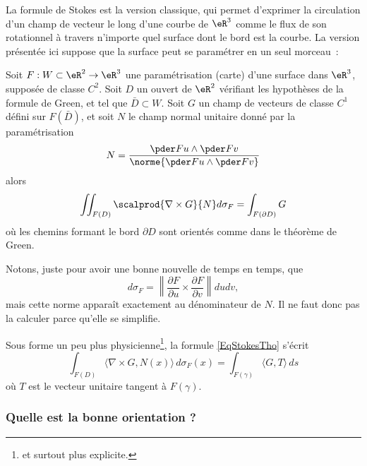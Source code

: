 La formule de Stokes est la version classique, qui permet d'exprimer la circulation d'un champ de vecteur le long d'une courbe de $\eR^3$ comme le flux de son rotationnel à travers n'importe quel surface dont le bord est la courbe. La version présentée ici suppose que la surface peut se paramétrer en un seul morceau~:
\begin{theorem}
  Soit $F : W\subset \eR^2 \to \eR^3$ une paramétrisation (carte) d'une surface dans $\eR^3$, supposée de classe $C^2$. Soit $D$ un ouvert de $\eR^2$ vérifiant les hypothèses de la formule de Green, et tel que $\bar D \subset W$. Soit $G$ un champ de vecteurs de classe $C^1$ défini sur $F(\bar D)$, et soit $N$ le champ normal unitaire donné par la paramétrisation
  \begin{equation}		
	N = \frac{\pder F u \wedge \pder F v}{\norme{\pder F u \wedge \pder F v}}
\end{equation}
  alors
  \begin{equation}\label{EqStokesTho}
    \iint_{F(D)} \scalprod{\nabla\times G}{N} d\sigma_F = \int_{F(\partial D)} G
  \end{equation}
  où les chemins formant le bord $\partial D$ sont orientés comme dans le théorème de Green.
\end{theorem}
Notons, juste pour avoir une bonne nouvelle de temps en temps, que 
\begin{equation}
	d\sigma_F=\left\| \frac{ \partial F }{ \partial u }\times\frac{ \partial F }{ \partial v }  \right\|dudv,
\end{equation}
mais cette norme apparaît exactement au dénominateur de $N$. Il ne faut donc pas la calculer parce qu'elle se simplifie.

Sous forme un peu plus physicienne\footnote{et surtout plus explicite.}, la formule \eqref{EqStokesTho} s'écrit
\begin{equation}
	\int_{F(D)}\langle \nabla\times G, N(x)\rangle\, d\sigma_F(x)=\int_{F(\gamma)}\langle G, T\rangle\, ds
\end{equation}
où $T$ est le vecteur unitaire tangent à $F(\gamma)$.

\subsubsection{Quelle est la bonne orientation ?}

